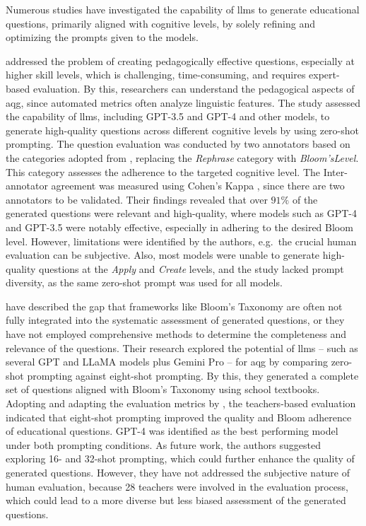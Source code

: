  Numerous studies have investigated the capability of \acp{llm} to generate educational questions, primarily aligned with cognitive levels, by solely refining and optimizing the prompts given to the models.

\cite{scaria_how_2024} addressed the problem of creating pedagogically effective questions, especially at higher skill levels, which is challenging, time-consuming, and requires expert-based evaluation. By this, researchers can understand the pedagogical aspects of \ac{aqg}, since automated metrics often analyze linguistic features. The study assessed the capability of \acp{llm}, including GPT-3.5 and GPT-4 and other models, to generate high-quality questions across different cognitive levels by using zero-shot prompting. The question evaluation was conducted by two annotators based on the categories adopted from \cite{horbach_linguistic_2020}, replacing the \textit{Rephrase} category with \textit{Bloom'sLevel}. This category assesses the adherence to the targeted cognitive level. The Inter-annotator agreement was measured using Cohen's Kappa \cite{cohen_coefficient_1960}, since there are two annotators to be validated. Their findings revealed that over $91\%$ of the generated questions were relevant and high-quality, where models such as GPT-4 and GPT-3.5 were notably effective, especially in adhering to the desired Bloom level. However, limitations were identified by the authors, e.g.\ the crucial human evaluation can be subjective. Also, most models were unable to generate high-quality questions at the \textit{Apply} and \textit{Create} levels, and the study lacked prompt diversity, as the same zero-shot prompt was used for all models.

\pagebreak

\cite{maity_can_2025} have described the gap that frameworks like Bloom's Taxonomy are often not fully integrated into the systematic assessment of generated questions, or they have not employed comprehensive methods to determine the completeness and relevance of the questions. Their research explored the potential of \acp{llm} -- such as several GPT and LLaMA models plus Gemini Pro -- for \ac{aqg} by comparing zero-shot prompting against eight-shot prompting. By this, they generated a complete set of questions aligned with Bloom's Taxonomy using school textbooks. Adopting and adapting the evaluation metrics by \cite{elkins_how_2023}, the teachers-based evaluation indicated that eight-shot prompting improved the quality and Bloom adherence of educational questions. GPT-4 was identified as the best performing model under both prompting conditions. As future work, the authors suggested exploring 16- and 32-shot prompting, which could further enhance the quality of generated questions. However, they have not addressed the subjective nature of human evaluation, because 28 teachers were involved in the evaluation process, which could lead to a more diverse but less biased assessment of the generated questions.

